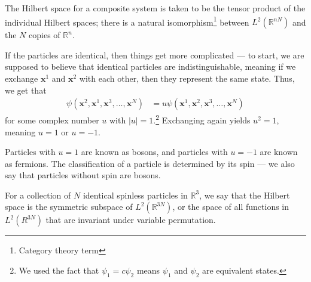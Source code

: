 \documentclass[10pt]{extarticle}
\newcommand{\R}{\mathbb{R}}
\theoremstyle{plain}
\theoremstyle{definition}
\theoremstyle{remark}
\renewcommand{\newline}{\hfill\break}
\begin{document}
  The Hilbert space for a composite system is taken to be the tensor product of the individual Hilbert spaces; there is a natural isomorphism\footnote{Category theory term} between $L^{2}(\R^{nN})$ and the $N$ copies of $\R^n$.\newline

  If the particles are identical, then things get more complicated --- to start, we are supposed to believe that identical particles are indistinguishable, meaning if we exchange $\mathbf{x}^1$ and $\mathbf{x}^2$ with each other, then they represent the same state. Thus, we get that
  \begin{align*}
    \psi\left(\mathbf{x}^2,\mathbf{x}^1,\mathbf{x}^3,\dots,\mathbf{x}^N\right) &= u\psi \left(\mathbf{x}^1,\mathbf{x}^2,\mathbf{x}^3,\dots,\mathbf{x}^N\right)
  \end{align*}
  for some complex number $u$ with $|u| = 1$.\footnote{We used the fact that $\psi_1 = c\psi_2$ means $\psi_1$ and $\psi_2$ are equivalent states.} Exchanging again yields $u^2 = 1$, meaning $u = 1$ or $u = -1$.\newline

  Particles with $u = 1$ are known as bosons, and particles with $u = -1$ are known as fermions. The classification of a particle is determined by its spin --- we also say that particles without spin are bosons.\newline

  For a collection of $N$ identical spinless particles in $\R^{3}$, we say that the Hilbert space is the symmetric subspace of $L^{2}\left(\R^{3N}\right)$, or the space of all functions in $L^{2}\left(R^{3N}\right)$ that are invariant under variable permutation.
\end{document}
